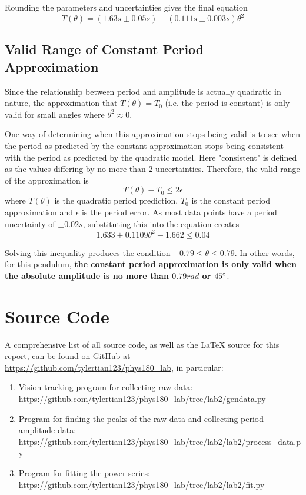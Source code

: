 \documentclass[aps,twocolumn,secnumarabic,nobalancelastpage,amsmath,amssymb,nofootinbib,floatfix]{revtex4}
\begin{document}
Rounding the parameters and uncertainties gives the final equation
\begin{equation}
    T(\theta) = (1.63\si{s} \pm 0.05\si{s}) + (0.111\si{s} \pm 0.003\si{s})\theta^2
\end{equation}

\subsection{Valid Range of Constant Period Approximation}

Since the relationship between period and amplitude is actually quadratic in nature, the approximation that
$T(\theta) = T_0$ (i.e. the period is constant) is only valid for small angles where $\theta^2 \approx 0$.

One way of determining when this approximation stops being valid is to see when the period as predicted by the constant
approximation stops being consistent with the period as predicted by the quadratic model. Here "consistent" is defined
as the values differing by no more than 2 uncertainties. Therefore, the valid range of the approximation is
\begin{equation}
    T(\theta) - T_0 \leq 2\epsilon
\end{equation}
where $T(\theta)$ is the quadratic period prediction, $T_0$ is the constant period approximation and $\epsilon$ is the
period error. As most data points have a period uncertainty of $\pm 0.02\si{s}$, substituting this into the equation creates
\begin{equation}
    1.633 + 0.1109\theta^2 - 1.662 \leq 0.04
\end{equation}

Solving this inequality produces the condition $-0.79 \leq \theta \leq 0.79$. In other words, for this pendulum,
\textbf{the constant period approximation is only valid when the absolute amplitude is no more than $0.79\si{rad}$ or
$45\degree$}.


\appendix

\section{Source Code}

A comprehensive list of all source code, as well as the \LaTeX{} source for this report, can be found on GitHub at
\url{https://github.com/tylertian123/phys180_lab}, in particular:
\label{appendix:code}
\begin{enumerate}
    \item Vision tracking program for collecting raw data: \url{https://github.com/tylertian123/phys180_lab/tree/lab2/gendata.py}
    \item Program for finding the peaks of the raw data and collecting period-amplitude data: \url{https://github.com/tylertian123/phys180_lab/tree/lab2/lab2/process_data.py}
    \item Program for fitting the power series: \url{https://github.com/tylertian123/phys180_lab/tree/lab2/lab2/fit.py}
\end{enumerate}
\end{document}
